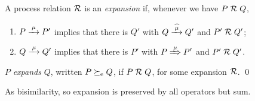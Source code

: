  
\begin{definition}[expansion]
\label{d:expa}
A process relation ${{\cal R}}$ 
 is an {\em  expansion} if, whenever
we have $P\mathrel{\cal R} Q$, %


\begin{enumerate}

\item   $P \arr\mu P'$ implies that there is $Q'$ with $Q \arcap \mu
  Q'$
 and $P' \mathrel{\cal R} Q'$;

\item 
    $Q \arr\mu Q'$   implies that there is $P'$ with $P \Arr \mu
 P'$ and $P' 
\mathrel{\cal R} Q'$.


\end{enumerate}
 $P$  {\em expands } $Q$, written
$P  \mathrel{\succeq_{\rm{e}}} Q$, 
if $P \mathrel{\cal R} Q$,  for some expansion ${\cal R}$. 
\qed\end{definition}


As bisimilarity, so expansion is preserved by all operators but sum. 

